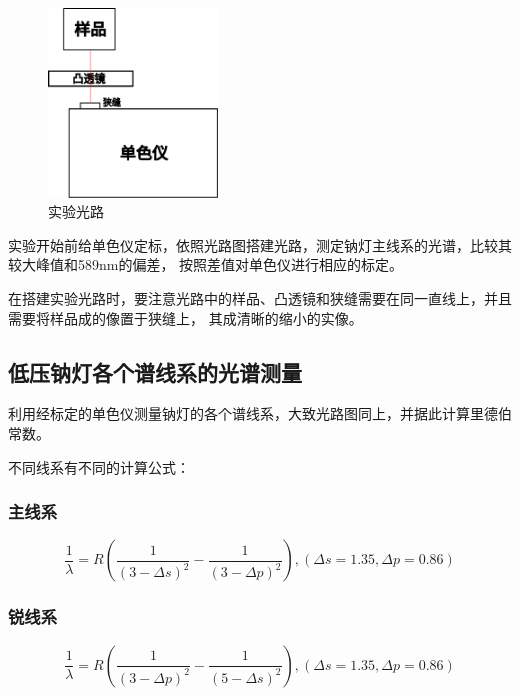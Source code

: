 \documentclass[a4paper,UTF8]{ctexart}
\begin{document}
\begin{figure}[H]
    \centering
    \begin{minipage}[b]{0.9\textwidth}
        \centering
        \includegraphics[width=0.4\textwidth]{./demo.pdf}
        \caption{实验光路}
    \end{minipage}
\end{figure}

实验开始前给单色仪定标，依照光路图搭建光路，测定钠灯主线系的光谱，比较其较大峰值和589nm的偏差，
按照差值对单色仪进行相应的标定。

在搭建实验光路时，要注意光路中的样品、凸透镜和狭缝需要在同一直线上，并且需要将样品成的像置于狭缝上，
其成清晰的缩小的实像。

\subsection{低压钠灯各个谱线系的光谱测量}

利用经标定的单色仪测量钠灯的各个谱线系，大致光路图同上，并据此计算里德伯常数。

不同线系有不同的计算公式：

\subsubsection{主线系}

\begin{equation}
    \frac{1}{\lambda} = R(\frac{1}{(3-\Delta s)^2}-\frac{1}{(3-\Delta p)^2}) , (\Delta s = 1.35,\Delta p = 0.86)
\end{equation}

\subsubsection{锐线系}

\begin{equation}
    \frac{1}{\lambda} = R(\frac{1}{(3-\Delta p)^2}-\frac{1}{(5-\Delta s)^2}) , (\Delta s = 1.35,\Delta p = 0.86)
\end{equation}
\end{document}
